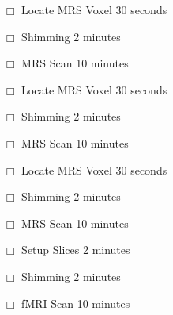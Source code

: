 \documentclass[10pt,a4paper]{scanner_protocol}
\begin{document}
\begin{itemize}
	\item[$\Box$] Locate MRS Voxel \hfill 30 seconds
	\item[$\Box$] Shimming \hfill 2 minutes
	\item[$\Box$] MRS Scan \hfill 10 minutes
\end{itemize}
\divider

\begin{itemize}
	\item[$\Box$] Locate MRS Voxel \hfill 30 seconds
	\item[$\Box$] Shimming \hfill 2 minutes
	\item[$\Box$] MRS Scan \hfill 10 minutes
\end{itemize}
\divider

\begin{itemize}
	\item[$\Box$] Locate MRS Voxel \hfill 30 seconds
	\item[$\Box$] Shimming \hfill 2 minutes
	\item[$\Box$] MRS Scan \hfill 10 minutes
\end{itemize}
\divider

\begin{itemize}
    \item[$\Box$] Setup Slices \hfill 2 minutes
	\item[$\Box$] Shimming \hfill 2 minutes
	\item[$\Box$] fMRI Scan \hfill 10 minutes
\end{itemize}
\divider

\clearpage







\end{document}
